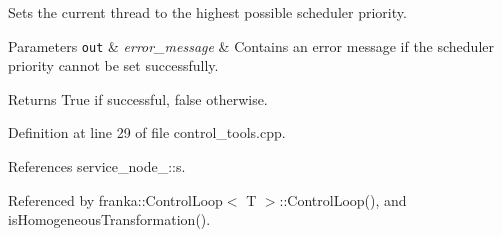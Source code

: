 Sets the current thread to the highest possible scheduler priority.


\begin{DoxyParams}[1]{Parameters}
\mbox{\tt out}  & {\em error\+\_\+message} & Contains an error message if the scheduler priority cannot be set successfully.\\
\hline
\end{DoxyParams}
\begin{DoxyReturn}{Returns}
True if successful, false otherwise. 
\end{DoxyReturn}


Definition at line 29 of file control\+\_\+tools.\+cpp.



References service\+\_\+node\+\_\+::s.



Referenced by franka\+::\+Control\+Loop$<$ T $>$\+::\+Control\+Loop(), and is\+Homogeneous\+Transformation().


